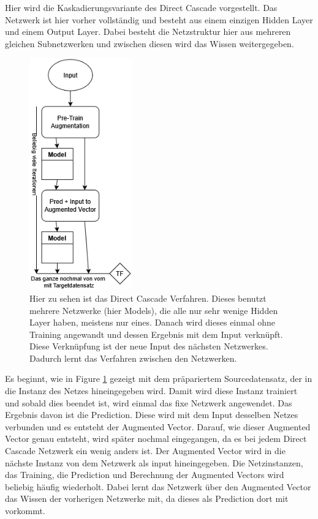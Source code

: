 Hier wird die Kaskadierungsvariante des Direct Cascade vorgestellt. 
Das Netzwerk ist hier vorher vollständig und besteht aus einem einzigen Hidden Layer und einem Output Layer. 
Dabei besteht die Netzstruktur hier aus mehreren gleichen Subnetzwerken und zwischen diesen wird das Wissen weitergegeben. 

\begin{figure}[htpb]
    \centering
    \includegraphics[height=10cm]{../../Graphiken/direct_cascade.png}
    \caption{\label{fig:directcascade} 
    \small{Hier zu sehen ist das Direct Cascade Verfahren. Dieses benutzt mehrere Netzwerke (hier Models), die alle nur sehr wenige 
    Hidden Layer haben, meistens nur eines. Danach wird dieses einmal ohne Training angewandt und dessen Ergebnis mit dem Input verknüpft. 
    Diese Verknüpfung ist der neue Input des nächsten Netzwerkes. Dadurch lernt das Verfahren zwischen den Netzwerken. }}
\end{figure}

Es beginnt, wie in Figure \ref{fig:directcascade} gezeigt mit dem präpariertem Sourcedatensatz, der in die Instanz des Netzes hineingegeben wird. 
Damit wird diese Instanz trainiert und sobald dies beendet ist, wird einmal das fixe Netzwerk angewendet. Das Ergebnis davon ist 
die Prediction. Diese wird mit dem Input desselben Netzes verbunden und es entsteht der Augmented Vector. Darauf, wie dieser Augmented 
Vector genau entsteht, wird später nochmal eingegangen, da es bei jedem Direct Cascade Netzwerk ein wenig anders ist. Der Augmented 
Vector wird in die nächste Instanz von dem Netzwerk als input hineingegeben. Die Netzinstanzen, das Training, die Prediction und 
Berechnung der Augmented Vectors wird beliebig häufig wiederholt. Dabei lernt das Netzwerk über den Augmented Vector das Wissen 
der vorherigen Netzwerke mit, da dieses als Prediction dort mit vorkommt. 

